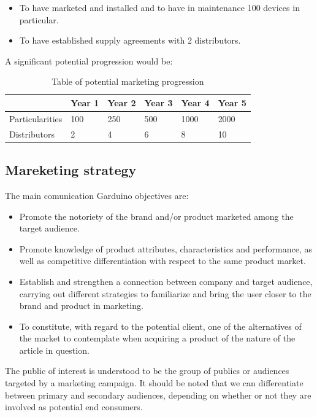 \documentclass[11pt,a4paper]{article}
\begin{document}
\begin{itemize}
\item To have marketed and installed and to have in maintenance 100 devices in particular. 
\item To have established supply agreements with 2 distributors. 
\end{itemize}
A significant potential progression would be:
\begin{table}[htbp]
\centering
\begin{tabular}{|l|l|l|l|l|l|}
\hline
\textbf{} & \textbf{Year 1} & \textbf{Year 2} & \textbf{Year 3} & \textbf{Year 4} & \textbf{Year 5} \\
\hline \hline
Particularities & 100 & 250 & 500 & 1000 & 2000 \\
\hline
Distributors & 2 & 4 & 6 & 8 & 10 \\
\hline
\end{tabular}
\caption{Table of potential marketing progression}
\end{table}

\subsection{Mareketing strategy}
The main comunication Garduino objectives are:
\begin{itemize}
\item Promote the notoriety of the brand and/or product marketed among the target audience.
\item Promote knowledge of product attributes, characteristics and performance, as well as competitive differentiation with respect to the same product market.
\item Establish and strengthen a connection between company and target audience, carrying out different strategies to familiarize and bring the user closer to the brand and product in marketing.
\item To constitute, with regard to the potential client, one of the alternatives of the market to contemplate when acquiring a product of the nature of the article in question.
\end{itemize}

The public of interest is understood to be the group of publics or audiences targeted by a marketing campaign. It should be noted that we can differentiate between primary and secondary audiences, depending on whether or not they are involved as potential end consumers.\\
\end{document}
